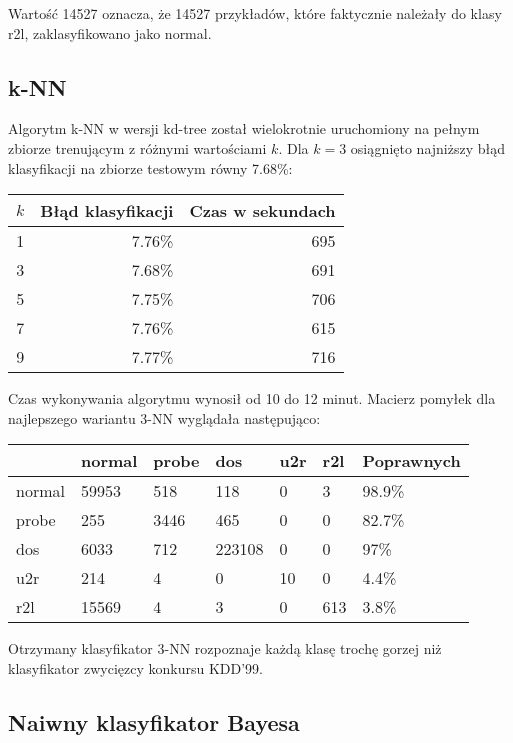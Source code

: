 \documentclass[a4paper, 12pt]{article}
\begin{document}
Wartość 14527 oznacza, że 14527 przykładów, które faktycznie należały do klasy r2l, zaklasyfikowano
jako normal.

\subsection{k-NN}

Algorytm k-NN w wersji kd-tree został wielokrotnie uruchomiony na pełnym zbiorze trenującym
z różnymi wartościami $k$.
Dla $k=3$ osiągnięto najniższy błąd klasyfikacji na zbiorze testowym równy 7.68\%:

\begin{table}[H]
\centering
\begin{tabular}{ | r | r | r | } \hline
$k$ & Błąd klasyfikacji & Czas w sekundach \\ \hline
1 & 7.76\% & 695 \\ \hline
3 & 7.68\% & 691 \\ \hline
5 & 7.75\% & 706 \\ \hline
7 & 7.76\% & 615 \\ \hline
9 & 7.77\% & 716 \\ \hline
\end{tabular} 
\end{table}

Czas wykonywania algorytmu wynosił od 10 do 12 minut.
Macierz pomyłek dla najlepszego wariantu 3-NN wyglądała następująco:

\begin{table}[H]
\centering
\begin{tabular}{ | l | l | l | l | l | l | l | } \hline
	& normal & probe & dos 	& u2r 	& r2l 	& Poprawnych	\\ \hline
normal 	& 59953 & 518 	& 118	& 0	& 3 	& 98.9\% 	\\ \hline
probe 	& 255 	& 3446 	& 465	& 0	& 0 	& 82.7\% 	\\ \hline
dos 	& 6033 	& 712 	& 223108& 0 	& 0 	& 97\% 		\\ \hline
u2r 	& 214 	& 4 	& 0	& 10	& 0	& 4.4\%		\\ \hline
r2l 	& 15569 & 4 	& 3	& 0	& 613	& 3.8\%		\\ \hline
\end{tabular} 
\end{table}

Otrzymany klasyfikator 3-NN rozpoznaje każdą klasę trochę gorzej niż klasyfikator zwycięzcy
konkursu KDD'99.

\subsection{Naiwny klasyfikator Bayesa}
\end{document}
